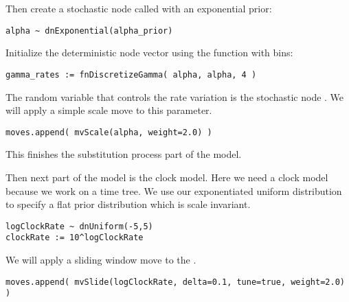 Then create a stochastic node called  with an exponential prior:
{\tt\begin{snugshade*}
\begin{lstlisting}
alpha ~ dnExponential(alpha_prior)
\end{lstlisting}
\end{snugshade*}}
Initialize the  deterministic node vector using the   function with  bins:
{\tt \begin{snugshade*}
\begin{lstlisting}
gamma_rates := fnDiscretizeGamma( alpha, alpha, 4 )
\end{lstlisting}
\end{snugshade*}}
The random variable that controls the rate variation is the stochastic node . 
We will apply a simple scale move to this parameter.
{\tt \begin{snugshade*}
\begin{lstlisting}
moves.append( mvScale(alpha, weight=2.0) )
\end{lstlisting}
\end{snugshade*}}
This finishes the substitution process part of the model.

Then next part of the model is the clock model. Here we need a clock model because we work on a time tree. We use our exponentiated uniform distribution to specify a flat prior distribution which is scale invariant.
{\tt \begin{snugshade*}
\begin{lstlisting}
logClockRate ~ dnUniform(-5,5)
clockRate := 10^logClockRate
\end{lstlisting}
\end{snugshade*}}
We will apply a sliding window move to the .
{\tt \begin{snugshade*}
\begin{lstlisting}
moves.append( mvSlide(logClockRate, delta=0.1, tune=true, weight=2.0) )
\end{lstlisting}
\end{snugshade*}}

